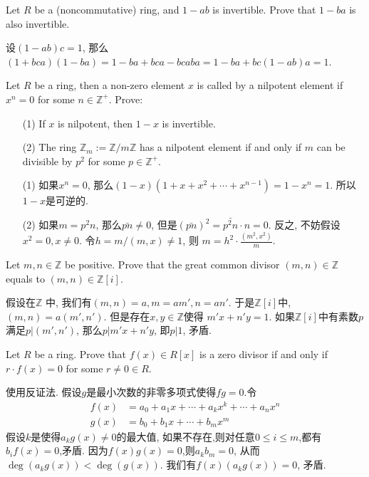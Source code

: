 \documentclass{exam-zh}
\newcommand{\ZZ}{{\mathbb{Z}}}
\begin{document}
\begin{question}
  Let $R$ be a (noncommutative) ring, and $1-ab$ is invertible. Prove that $1-ba$ is also invertible.
\end{question}
\begin{solution}
  设$(1-ab)c=1$, 那么$(1+bca)(1-ba)=1-ba+bca-bcaba=1-ba+bc(1-ab)a=1$.
\end{solution}
\begin{question}
  Let $R$ be a ring, then a non-zero element $x$ is called by a nilpotent element if $x^n=0$ for some $n\in \ZZ^+$. Prove:
  \begin{enumerate}
    \item[(1)] If $x$ is nilpotent, then $1-x$ is invertible.
    \item[(2)] The ring $\ZZ_m:=\ZZ/m\ZZ$ has a nilpotent element if and only if $m$ can be divisible by $p^2$ for some $p\in\ZZ^+$.
  \end{enumerate}
\end{question}
\begin{solution}
  \begin{enumerate}
    \item[(1)] 如果$x^n=0$, 那么$(1-x)(1+x+x^2+\cdots+x^{n-1})=1-x^n=1$. 所以$1-x$是可逆的.
    \item[(2)] 如果$m=p^2n$, 那么$\bar{pn}\neq 0$, 但是$(\bar{pn})^2=\bar{p^2n}\cdot n=0$. 反之, 不妨假设 $x^2=0, x\neq 0$. 令$h=m/(m,x)\neq 1$, 则 $m = h^2\cdot \frac{(m^2,x^2)}{m}$.
  \end{enumerate}
\end{solution}
\begin{question}
  Let $m, n\in\ZZ$ be positive. Prove that the great common divisor $(m,n)\in\ZZ$ equals to $(m,n)\in \ZZ[i]$.
\end{question}
\begin{solution}
  假设在$\ZZ$ 中, 我们有$(m,n)=a, m=am', n=an'$. 于是$\ZZ[i]$中, $(m,n)=a(m',n')$. 但是存在$x,y\in \ZZ$使得 $m'x+n'y=1$. 如果$\ZZ[i]$中有素数$p$满足$p|(m',n')$, 那么$p|m'x+n'y$, 即$p|1$, 矛盾.
\end{solution}
\begin{question}
  Let $R$ be a ring. Prove that $f(x)\in R[x]$ is a zero divisor if and only if $r\cdot f(x)=0$ for some $r\neq 0\in R$.
\end{question}
\begin{solution}
  使用反证法. 假设$g$是最小次数的非零多项式使得$fg=0$.令\[\begin{split}
    f(x)&=a_0+a_1x+\cdots+a_kx^k+\cdots +a_nx^n\\
    g(x)&=b_0+b_1x+\cdots+b_mx^m
  \end{split}\]
  假设$k$是使得$a_kg(x)\neq 0$的最大值, 如果不存在,则对任意$0\leq i\leq m$,都有$b_if(x)=0$,矛盾. 因为$f(x)g(x)=0$,则$a_kb_m=0$, 从而$\deg(a_kg(x))<\deg(g(x))$. 我们有$f(x)(a_kg(x))=0$, 矛盾.
\end{solution}
\end{document}
